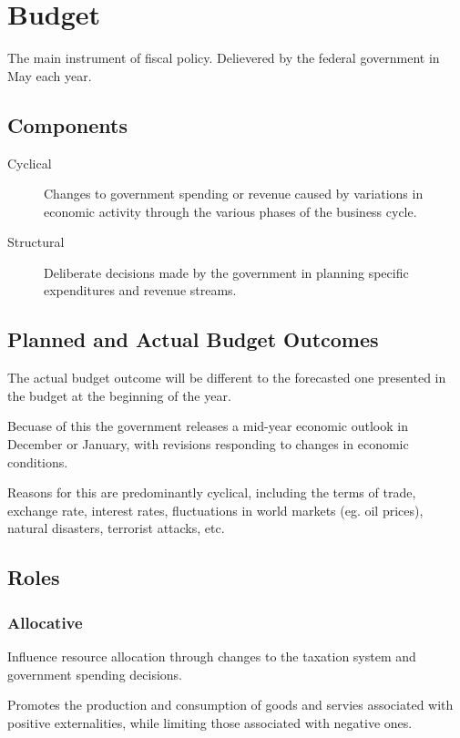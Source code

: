 \documentclass[a4paper,11pt]{report}
\begin{document}
\section{Budget}

The main instrument of fiscal policy. Delievered by the federal government in
May each year.

\subsection{Components}

\begin{description}
\item [Cyclical] Changes to government spending or revenue caused by variations
	in economic activity through the various phases of the business cycle.
\item [Structural] Deliberate decisions made by the government in planning
	specific expenditures and revenue streams.
\end{description}

\subsection{Planned and Actual Budget Outcomes}

The actual budget outcome will be different to the forecasted one presented in
the budget at the beginning of the year.

Becuase of this the government releases a mid-year economic outlook in December
or January, with revisions responding to changes in economic conditions.

Reasons for this are predominantly cyclical, including the terms of trade,
exchange rate, interest rates, fluctuations in world markets (eg. oil prices),
natural disasters, terrorist attacks, etc.

\subsection{Roles}

\subsubsection{Allocative}

Influence resource allocation through changes to the taxation system and
government spending decisions.

Promotes the production and consumption of goods and servies associated with
positive externalities, while limiting those associated with negative ones.
\end{document}
